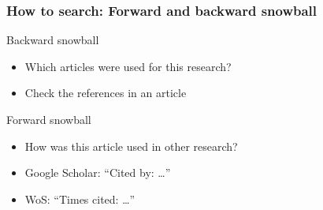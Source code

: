 \documentclass[%
	shownavigationbar=	false,%
	showsidebar= 		false,%
	fleqn,%
	xcolor=			{usenames, svgnames},%
	usepdftitle=			false,%
]{beamer}
\begin{document}
\begin{frame}
\frametitle{How to search: Forward and backward snowball}
\begin{block}{Backward snowball}
\begin{itemize}
	\item Which articles were used for this research?
	\item Check the references in an article
\end{itemize}
\end{block}

\begin{block}{Forward snowball}
\begin{itemize}
	\item How was this article used in other research?
	\item Google Scholar: ``Cited by: \ldots''
    \item WoS: ``Times cited: \ldots''
\end{itemize}
\end{block}
\end{frame}

\begin{frame}[plain]
\end{frame}
\end{document}
